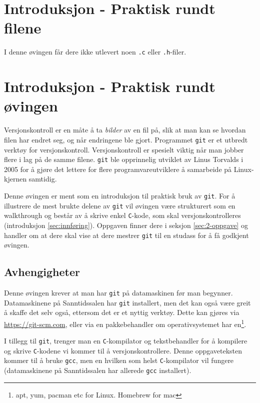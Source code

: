 \begin{alphasection}
\section{Introduksjon - Praktisk rundt filene}

I denne øvingen får dere ikke utlevert noen \verb|.c| eller \verb|.h|-filer.


\section{Introduksjon - Praktisk rundt øvingen}
Versjonskontroll er en måte å ta \textit{bilder} av en fil på, slik at man kan se hvordan filen har endret seg, og når endringene ble gjort. Programmet \verb|git| er et utbredt verktøy for versjonskontroll. Versjonskontroll er spesielt viktig når man jobber flere i lag på de samme filene. \verb|git| ble opprinnelig utviklet av Linus Torvalds i 2005 for å gjøre det lettere for flere programvareutviklere å samarbeide på Linux-kjernen samtidig. 

 Denne øvingen er ment som en introduksjon til praktisk bruk av \verb|git|. For å illustrere de mest brukte delene av \verb|git| vil øvingen være strukturert som en walkthrough og består av å skrive enkel \verb|C|-kode, som skal versjonskontrolleres (introduksjon \ref{sec:innføring}). Oppgaven finner dere i seksjon \ref{sec:2-oppgave} og handler om at dere skal vise at dere mestrer \verb|git| til en studass for å få godkjent øvingen.

\subsection{Avhengigheter}

Denne øvingen krever at man har \verb|git| på datamaskinen før man begynner. Datamaskinene på Sanntidssalen har \verb|git| installert, men det kan også være greit å skaffe det selv også, ettersom det er et nyttig verktøy. Dette kan gjøres via \href{https://git-scm.com/downloads}{https://git-scm.com}, eller via en pakkebehandler om operativsystemet har en\footnote{apt, yum, pacman etc for Linux. Homebrew for mac}.

I tillegg til \verb|git|, trenger man en \verb|C|-kompilator og tekstbehandler for å kompilere og skrive \verb|C|-kodene vi kommer til å versjonskontrollere. Denne oppgaveteksten kommer til å bruke \verb|gcc|, men en hvilken som helst \verb|C|-kompilator vil fungere (datamaskinene på Sanntidssalen har allerede \verb|gcc| installert).



\end{alphasection}
